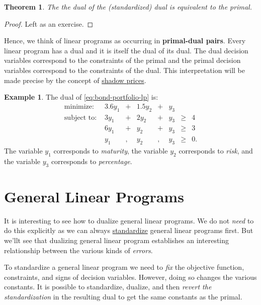 \documentclass[
]{book}
\newtheorem{theorem}{Theorem}[chapter]
\theoremstyle{definition}
\theoremstyle{definition}
\newtheorem{example}{Example}[chapter]
\theoremstyle{definition}
\theoremstyle{definition}
\theoremstyle{remark}
\begin{document}
\begin{theorem}
The the dual of the (standardized) dual is equivalent to the primal.
\end{theorem}

\begin{proof}
Left as an exercise.
\end{proof}

Hence, we think of linear programs as occurring in \textbf{primal-dual pairs}. Every linear program has a
dual and it is itself the dual of its dual. The dual decision variables correspond to the
constraints of the primal and the primal decision variables correspond to the constraints of the
dual. This interpretation will be made precise by the concept of \protect\hyperlink{shadow-prices}{shadow prices}.

\begin{example}
\protect\hypertarget{exm:bond-portfolio-dual}{}\label{exm:bond-portfolio-dual}The dual of \eqref{eq:bond-portfolio-lp} is:
\begin{equation}
\begin{array}{lrrrrrrrrrr}
  \mbox{minimize: } 
    & 3.6 y_1 & + & 1.5 y_2 & + & y_3 \\
  \mbox{subject to: }
    & 3y_1 & + & 2 y_2 & + & y_3 & \geq & 4 \\
    & 6y_1 & + & y_2 & + & y_3 & \geq & 3 \\
    & y_1 & , & y_2 & , & y_3 & \geq & 0.
\end{array}
\label{eq:bond-portfolio-dual}
\end{equation}
The variable \(y_1\) corresponds to \emph{maturity}, the variable \(y_2\) corresponds to \emph{risk}, and the variable \(y_3\) corresponds to \emph{percentage}.
\end{example}

\hypertarget{general-linear-programs}{%
\section{General Linear Programs}\label{general-linear-programs}}

It is interesting to see how to dualize general linear programs. We do not \emph{need} to do this
explicitly as we can always \protect\hyperlink{standardization}{standardize} general linear programs first. But we'llt
see that dualizing general linear program establishes an interesting relationship between the
various kinds of \emph{errors}.

To standardize a general linear program we need to \emph{fix} the objective function, constraints, and
signs of decision variables. However, doing so changes the various constants. It is possible to
standardize, dualize, and then \emph{revert the standardization} in the resulting dual to get the same
constants as the primal.
\end{document}
